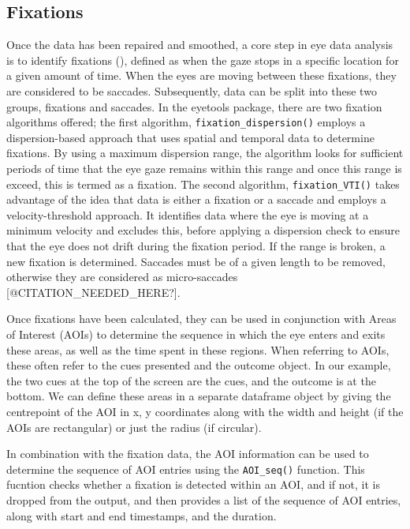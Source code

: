 \documentclass[
  man,
  floatsintext,
  longtable,
  nolmodern,
  notxfonts,
  notimes,
  colorlinks=true,linkcolor=blue,citecolor=blue,urlcolor=blue]{apa7}
\begin{document}
\subsection{Fixations}\label{fixations}

Once the data has been repaired and smoothed, a core step in eye data
analysis is to identify fixations
(),
defined as when the gaze stops in a specific location for a given amount
of time. When the eyes are moving between these fixations, they are
considered to be saccades. Subsequently, data can be split into these
two groups, fixations and saccades. In the eyetools package, there are
two fixation algorithms offered; the first algorithm,
\texttt{fixation\_dispersion()} employs a dispersion-based approach that
uses spatial and temporal data to determine fixations. By using a
maximum dispersion range, the algorithm looks for sufficient periods of
time that the eye gaze remains within this range and once this range is
exceed, this is termed as a fixation. The second algorithm,
\texttt{fixation\_VTI()} takes advantage of the idea that data is either
a fixation or a saccade and employs a velocity-threshold approach. It
identifies data where the eye is moving at a minimum velocity and
excludes this, before applying a dispersion check to ensure that the eye
does not drift during the fixation period. If the range is broken, a new
fixation is determined. Saccades must be of a given length to be
removed, otherwise they are considered as micro-saccades
{[}@CITATION\_NEEDED\_HERE?{]}.

Once fixations have been calculated, they can be used in conjunction
with Areas of Interest (AOIs) to determine the sequence in which the eye
enters and exits these areas, as well as the time spent in these
regions. When referring to AOIs, these often refer to the cues presented
and the outcome object. In our example, the two cues at the top of the
screen are the cues, and the outcome is at the bottom. We can define
these areas in a separate dataframe object by giving the centrepoint of
the AOI in x, y coordinates along with the width and height (if the AOIs
are rectangular) or just the radius (if circular).

In combination with the fixation data, the AOI information can be used
to determine the sequence of AOI entries using the \texttt{AOI\_seq()}
function. This fucntion checks whether a fixation is detected within an
AOI, and if not, it is dropped from the output, and then provides a list
of the sequence of AOI entries, along with start and end timestamps, and
the duration.
\end{document}
